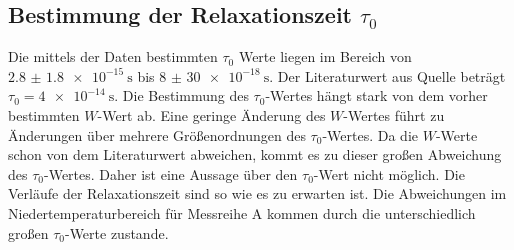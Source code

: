 \subsection{Bestimmung der Relaxationszeit \texorpdfstring{$\tau_{0}$}{T1}}
Die mittels der Daten bestimmten $\tau_0$ Werte liegen im Bereich von $\SI{2.8(18)e-15}{\second}$ bis $\SI{8(30)e-18}{\second}$.
Der Literaturwert aus Quelle \cite{Muccillo} beträgt $\tau_0=\SI{4e-14}{\second}$. Die Bestimmung des $\tau_0$-Wertes 
hängt stark von dem vorher bestimmten $W$-Wert ab. Eine geringe Änderung des $W$-Wertes führt zu Änderungen über 
mehrere Größenordnungen des $\tau_0$-Wertes. Da die $W$-Werte schon von dem Literaturwert abweichen, kommt es zu 
dieser großen Abweichung des $\tau_0$-Wertes. Daher ist eine Aussage über den $\tau_0$-Wert nicht möglich.
Die Verläufe der Relaxationszeit sind so wie es zu erwarten ist. Die Abweichungen im Niedertemperaturbereich für 
Messreihe A kommen durch die unterschiedlich großen $\tau_0$-Werte zustande.
\newpage

